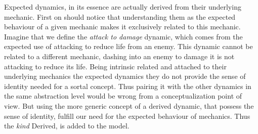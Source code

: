 Expected dynamics, in its essence are actually derived from their underlying mechanic. First on should notice that understanding them as the expected behaviour of a given mechanic makes it exclusively related to this mechanic. Imagine that we define the \textit{attack to damage} dynamic, which comes from the expected use of attacking to reduce life from an enemy. This dynamic cannot be related to a different mechanic, dashing into an enemy to damage it is not attacking to reduce its life. Being intrinsic related and attached to their underlying mechanics the expected dynamics they do not provide the sense of identity needed for a sortal concept. Thus pairing it with the other dynamics in the same abstraction level would be wrong from a conceptualization point of view. But using the more generic concept of a derived dynamic, that possess the sense of identity, fulfill our need for the expected behaviour of mechanics. Thus the \textit{kind} Derived, is added to the model. 

